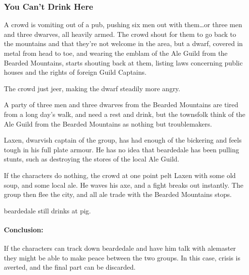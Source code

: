 \subsubsection{You Can't Drink Here}

\begin{boxtext}
	A crowd is vomiting out of a pub, pushing six men out with them\ldots or three men and three dwarves, all heavily armed.  The crowd shout for them to go back to the mountains and that they're not welcome in the area, but a dwarf, covered in metal from head to toe, and wearing the emblam of the Ale Guild from the Bearded Mountains, starts shouting back at them, listing laws concerning public houses and the rights of foreign Guild Captains.

	The crowd just jeer, making the dwarf steadily more angry.
\end{boxtext}

A party of three men and three dwarves from the Bearded Mountains are tired from a long day's walk, and need a rest and drink, but the townsfolk think of the Ale Guild from the Bearded Mountains as nothing but troublemakers.

Laxen, dwarvish captain of the group, has had enough of the bickering and feels tough in his full plate armour.  He has no idea that \gls{beardedale} has been pulling stunts, such as destroying the stores of the local Ale Guild.

If the characters do nothing, the crowd at one point pelt Laxen with some old soup, and some local ale.  He waves his axe, and a fight breaks out instantly.  The group then flee the city, and all ale trade with the Bearded Mountains stops.

\dwarvensoldier


\dwarventrader

\humansoldier

\Gls{beardedale} still drinks at \gls{pig}.  

\paragraph{Conclusion:} If the characters can track down \gls{beardedale} and have him talk with \gls{alemaster} they might be able to make peace between the two groups.  In this case, crisis is averted, and the final part can be discarded.

